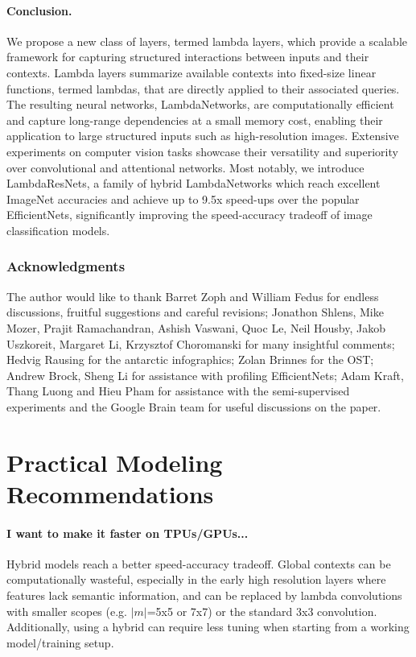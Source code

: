 \documentclass{article} \usepackage{iclr2021_conference,times}
\begin{document}
\vspace{-0.1cm}
\paragraph{Conclusion.}
We propose a new class of layers, termed lambda layers, which provide a scalable framework for capturing structured interactions between inputs and their contexts.
Lambda layers summarize available contexts into fixed-size linear functions, termed lambdas, that are directly applied to their associated queries.
The resulting neural networks, LambdaNetworks, are computationally efficient and capture long-range dependencies at a small memory cost, enabling their application to large structured inputs such as high-resolution images.
Extensive experiments on computer vision tasks showcase their versatility and superiority over convolutional and attentional networks.
Most notably, we introduce LambdaResNets, a family of hybrid LambdaNetworks which reach excellent ImageNet accuracies and achieve up to 9.5x speed-ups over the popular EfficientNets, significantly improving the speed-accuracy tradeoff of image classification models. 
\subsubsection*{Acknowledgments}
The author would like to thank Barret Zoph and William Fedus for endless discussions, fruitful suggestions and careful revisions;
Jonathon Shlens, Mike Mozer, Prajit Ramachandran, Ashish Vaswani, Quoc Le, Neil Housby, Jakob Uszkoreit, Margaret Li, Krzysztof Choromanski for many insightful comments;
Hedvig Rausing for the antarctic infographics;
Zolan Brinnes for the OST;
Andrew Brock, Sheng Li for assistance with profiling EfficientNets;
Adam Kraft, Thang Luong and Hieu Pham for assistance with the semi-supervised experiments
and the Google Brain team for useful discussions on the paper.




\newpage
\appendix
\section{Practical Modeling Recommendations\label{sec:practical recommendations}}

\paragraph{I want to make it faster on TPUs/GPUs...}
Hybrid models reach a better speed-accuracy tradeoff.
Global contexts can be computationally wasteful, especially in the early high resolution layers where features lack semantic information, and can be replaced by lambda convolutions with smaller scopes (e.g. $|m|$=5x5 or 7x7) or the standard 3x3 convolution.
Additionally, using a hybrid can require less tuning when starting from a working model/training setup.
\end{document}
